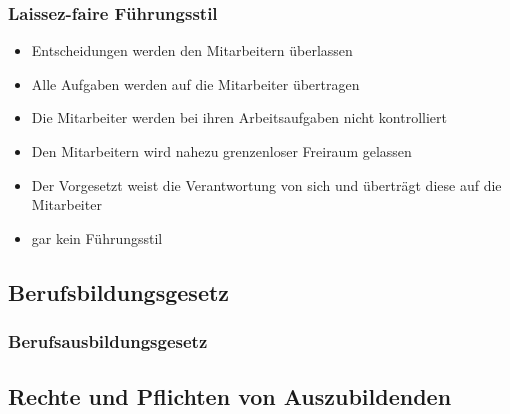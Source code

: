 \subsubsection{Laissez-faire Führungsstil}
\begin{itemize}
	\item Entscheidungen werden den Mitarbeitern überlassen
	\item Alle Aufgaben werden auf die Mitarbeiter übertragen
	\item Die Mitarbeiter werden bei ihren Arbeitsaufgaben nicht kontrolliert
	\item Den Mitarbeitern wird nahezu grenzenloser Freiraum gelassen
	\item Der Vorgesetzt weist die Verantwortung von sich und überträgt diese auf die Mitarbeiter
	\item \ql gar kein Führungsstil\qr
\end{itemize}

\subsection{Berufsbildungsgesetz}
\subsubsection{Berufsausbildungsgesetz}

\subsection{Rechte und Pflichten von Auszubildenden}